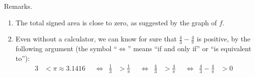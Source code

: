 {Remarks.
\begin{enumerate}
\item The total signed area is close to zero, as suggested by the graph of $f$.
\item Even without a calculator, we can know for sure that $\frac{4}{3} - \frac{4}{\pi}$ is positive, by the following argument (the symbol ``$\Leftrightarrow$'' means ``if and only if'' or ``is equivalent to''):
\begin{align*}
3
&<
\pi
\approx
3.1416
&
&\Leftrightarrow
&
\frac{1}{3}
&>
\frac{1}{\pi}
&
&\Leftrightarrow
&
\frac{4}{3}
&>
\frac{4}{\pi}
&
&\Leftrightarrow
&
\frac{4}{3} - \frac{4}{\pi}
&>
0
\end{align*}
\end{enumerate}}%